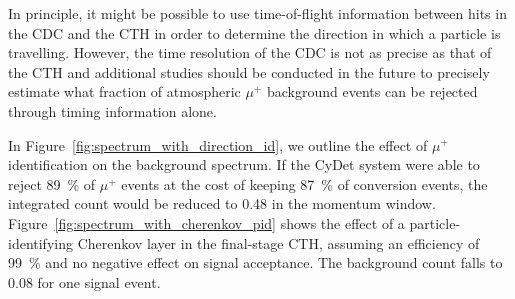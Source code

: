 In principle, it might be possible to use time-of-flight information between
hits in the CDC and the CTH in order to determine the direction in which a
particle is travelling. However, the time resolution of the CDC is not as
precise as that of the CTH and additional studies should be conducted in the
future to precisely estimate what fraction of atmospheric $\mu^+$ background
events can be rejected through timing information alone.



In Figure~\ref{fig:spectrum_with_direction_id}, we outline the effect of $\mu^+$
identification on the background spectrum. If the CyDet system were able to
reject \SI{89}{\percent} of $\mu^+$ events at the cost of keeping
\SI{87}{\percent} of conversion events, the integrated count would be reduced to
0.48 in the momentum window. Figure~\ref{fig:spectrum_with_cherenkov_pid} shows
the effect of a particle-identifying Cherenkov layer in the final-stage CTH,
assuming an efficiency of \SI{99}{\percent} and no negative effect on signal
acceptance. The background count falls to 0.08 for one signal event.

